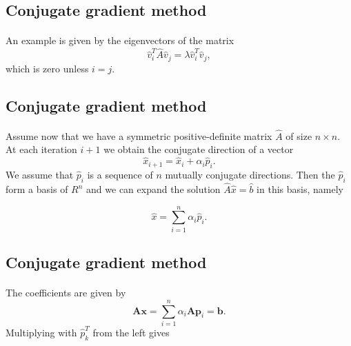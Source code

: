 \documentclass[%
oneside,                 %
final,                   %
10pt]{article}
\begin{document}
\subsection{Conjugate gradient method}

\paragraph{}
An example is given by the eigenvectors of the matrix
\begin{equation*}
\hat{v}_i^T\hat{A}\hat{v}_j= \lambda\hat{v}_i^T\hat{v}_j,
\end{equation*}
which is zero unless $i=j$.




\subsection{Conjugate gradient method}

\paragraph{}
Assume now that we have a symmetric positive-definite matrix $\hat{A}$ of size
$n\times n$. At each iteration $i+1$ we obtain the conjugate direction of a vector
\begin{equation*}
\hat{x}_{i+1}=\hat{x}_{i}+\alpha_i\hat{p}_{i}. 
\end{equation*}
We assume that $\hat{p}_{i}$ is a sequence of $n$ mutually conjugate directions. 
Then the $\hat{p}_{i}$  form a basis of $R^n$ and we can expand the solution 
$  \hat{A}\hat{x} = \hat{b}$ in this basis, namely

\begin{equation*}
  \hat{x}  = \sum^{n}_{i=1} \alpha_i \hat{p}_i.
\end{equation*}



\subsection{Conjugate gradient method}

\paragraph{}
The coefficients are given by
\begin{equation*}
    \mathbf{A}\mathbf{x} = \sum^{n}_{i=1} \alpha_i \mathbf{A} \mathbf{p}_i = \mathbf{b}.
\end{equation*}
Multiplying with $\hat{p}_k^T$  from the left gives
\end{document}
